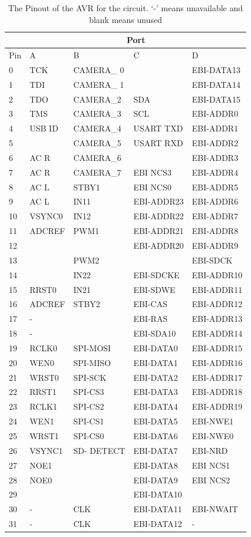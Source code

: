 \begin{table}
\centering
\caption{The Pinout of the AVR for the circuit. `-' means unavailable and blank means unused}
\label{table:UC3C:Pinout}
\begin{tabular}{|p{2cm}|p{3cm}|p{3cm}|p{3cm}|p{3cm}|}\cline{2-5}
\multicolumn{1}{c|}{ } & \multicolumn{4}{|c|}{Port} \\ \hline
Pin & A & B & C & D \\ \hline
0&TCK&CAMERA\_ 0&&EBI-DATA13\\
1&TDI&CAMERA\_ 1&&EBI-DATA14\\
2&TDO&CAMERA\_2&SDA&EBI-DATA15\\
3&TMS&CAMERA\_3&SCL&EBI-ADDR0\\
4&USB ID&CAMERA\_4&USART TXD&EBI-ADDR1\\
5&&CAMERA\_5&USART RXD&EBI-ADDR2\\
6&AC R&CAMERA\_6&&EBI-ADDR3\\
7&AC R&CAMERA\_7&EBI NCS3&EBI-ADDR4\\
8&AC L&STBY1&EBI NCS0&EBI-ADDR5\\
9&AC L&IN11&EBI-ADDR23&EBI-ADDR6\\
10&VSYNC0&IN12&EBI-ADDR22&EBI-ADDR7\\
11&ADCREF&PWM1&EBI-ADDR21&EBI-ADDR8\\
12&&&EBI-ADDR20&EBI-ADDR9\\
13&&PWM2&&EBI-SDCK\\
14&&IN22&EBI-SDCKE&EBI-ADDR10\\
15&RRST0&IN21&EBI-SDWE&EBI-ADDR11\\
16&ADCREF&STBY2&EBI-CAS&EBI-ADDR12\\
17&-&&EBI-RAS&EBI-ADDR13\\
18&-&&EBI-SDA10&EBI-ADDR14\\
19&RCLK0&SPI-MOSI&EBI-DATA0&EBI-ADDR15\\
20&WEN0&SPI-MISO&EBI-DATA1&EBI-ADDR16\\
21&WRST0&SPI-SCK&EBI-DATA2&EBI-ADDR17\\
22&RRST1&SPI-CS3&EBI-DATA3&EBI-ADDR18\\
23&RCLK1&SPI-CS2&EBI-DATA4&EBI-ADDR19\\
24&WEN1&SPI-CS1&EBI-DATA5&EBI-NWE1\\
25&WRST1&SPI-CS0&EBI-DATA6&EBI-NWE0\\
26&VSYNC1&SD- DETECT&EBI-DATA7&EBI-NRD\\
27&NOE1&&EBI-DATA8&EBI NCS1\\
28&NOE0&&EBI-DATA9&EBI NCS2\\
29&&&EBI-DATA10&\\
30&-&CLK&EBI-DATA11&EBI-NWAIT\\
31&-&CLK&EBI-DATA12&-\\ \hline

\end{tabular}
\end{table}

